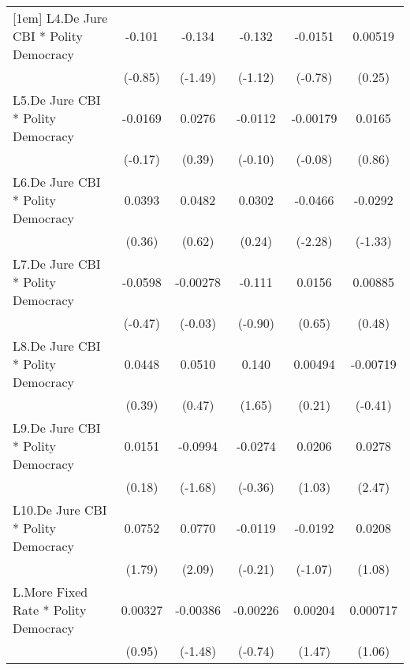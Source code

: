{\begin{tabular}{l*{5}{c}}
[1em]
L4.De Jure CBI * Polity Democracy&   -0.101         &   -0.134         &   -0.132         &  -0.0151         &  0.00519         \\
                &  (-0.85)         &  (-1.49)         &  (-1.12)         &  (-0.78)         &   (0.25)         \\
[1em]
L5.De Jure CBI * Polity Democracy&  -0.0169         &   0.0276         &  -0.0112         & -0.00179         &   0.0165         \\
                &  (-0.17)         &   (0.39)         &  (-0.10)         &  (-0.08)         &   (0.86)         \\
[1em]
L6.De Jure CBI * Polity Democracy&   0.0393         &   0.0482         &   0.0302         &  -0.0466\sym{*}  &  -0.0292         \\
                &   (0.36)         &   (0.62)         &   (0.24)         &  (-2.28)         &  (-1.33)         \\
[1em]
L7.De Jure CBI * Polity Democracy&  -0.0598         & -0.00278         &   -0.111         &   0.0156         &  0.00885         \\
                &  (-0.47)         &  (-0.03)         &  (-0.90)         &   (0.65)         &   (0.48)         \\
[1em]
L8.De Jure CBI * Polity Democracy&   0.0448         &   0.0510         &    0.140         &  0.00494         & -0.00719         \\
                &   (0.39)         &   (0.47)         &   (1.65)         &   (0.21)         &  (-0.41)         \\
[1em]
L9.De Jure CBI * Polity Democracy&   0.0151         &  -0.0994         &  -0.0274         &   0.0206         &   0.0278\sym{*}  \\
                &   (0.18)         &  (-1.68)         &  (-0.36)         &   (1.03)         &   (2.47)         \\
[1em]
L10.De Jure CBI * Polity Democracy&   0.0752         &   0.0770\sym{*}  &  -0.0119         &  -0.0192         &   0.0208         \\
                &   (1.79)         &   (2.09)         &  (-0.21)         &  (-1.07)         &   (1.08)         \\
[1em]
L.More Fixed Rate * Polity Democracy&  0.00327         & -0.00386         & -0.00226         &  0.00204         & 0.000717         \\
                &   (0.95)         &  (-1.48)         &  (-0.74)         &   (1.47)         &   (1.06)         \\

\end{tabular}}
